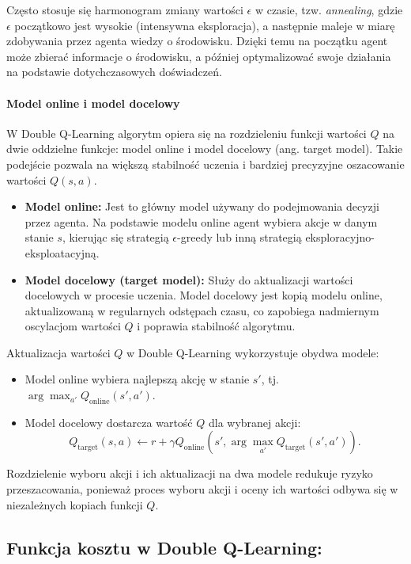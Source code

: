 Często stosuje się harmonogram zmiany wartości \(\epsilon\) w czasie, tzw. \textit{annealing}, gdzie \(\epsilon\) początkowo jest wysokie (intensywna eksploracja), a następnie maleje w miarę zdobywania przez agenta wiedzy o środowisku. Dzięki temu na początku agent może zbierać informacje o środowisku, a później optymalizować swoje działania na podstawie dotychczasowych doświadczeń.

\paragraph{Model online i model docelowy}

W Double Q-Learning algorytm opiera się na rozdzieleniu funkcji wartości \(Q\) na dwie oddzielne funkcje: model online i model docelowy (ang. target model). Takie podejście pozwala na większą stabilność uczenia i bardziej precyzyjne oszacowanie wartości \(Q(s, a)\).

\begin{itemize}
	\item \textbf{Model online:} Jest to główny model używany do podejmowania decyzji przez agenta. Na podstawie modelu online agent wybiera akcje w danym stanie \(s\), kierując się strategią \( \epsilon\)-greedy lub inną strategią eksploracyjno-eksploatacyjną.
	\item \textbf{Model docelowy (target model):} Służy do aktualizacji wartości docelowych w procesie uczenia. Model docelowy jest kopią modelu online, aktualizowaną w regularnych odstępach czasu, co zapobiega nadmiernym oscylacjom wartości \(Q\) i poprawia stabilność algorytmu.
\end{itemize}

Aktualizacja wartości \(Q\) w Double Q-Learning wykorzystuje obydwa modele:
\begin{itemize}
	\item Model online wybiera najlepszą akcję w stanie \(s'\), tj. \(\arg\max_{a'} Q_\text{online}(s', a')\).
	\item Model docelowy dostarcza wartość \(Q\) dla wybranej akcji:
	      \[
		      Q_\text{target}(s, a) \leftarrow r + \gamma Q_\text{online}(s', \arg\max_{a'} Q_\text{target}(s', a')).
	      \]
\end{itemize}

Rozdzielenie wyboru akcji i ich aktualizacji na dwa modele redukuje ryzyko przeszacowania, ponieważ proces wyboru akcji i oceny ich wartości odbywa się w niezależnych kopiach funkcji \(Q\).

\subsection{Funkcja kosztu w Double Q-Learning:}

